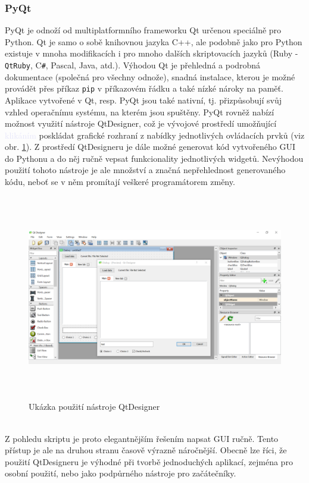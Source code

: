 \documentclass[a4paper, 12pt]{article}
\begin{document}
\subsubsection*{PyQt}
PyQt je odnoží od multiplatformního frameworku Qt určenou speciálně pro Python. Qt je samo o sobě knihovnou jazyka C++, ale podobně jako pro Python existuje v mnoha modifikacích i pro mnoho dalších skriptovacích jazyků (Ruby - \texttt{QtRuby}, C\texttt{\#}, Pascal, Java, atd.). Výhodou Qt je přehledná a podrobná dokumentace (společná pro všechny odnože), snadná instalace, kterou je možné provádět přes příkaz \texttt{pip} v příkazovém řádku a také nízké nároky na paměť. Aplikace vytvořené v Qt, resp. PyQt jsou také nativní, tj. přizpůsobují svůj vzhled operačnímu systému, na kterém jsou spuštěny. PyQt rovněž nabízí možnost využití nástroje QtDesigner, což je vývojové prostředí umožňující \textcolor{lavender}{klikáním} poskládat grafické rozhraní z nabídky jednotlivých ovládacích prvků (viz obr. \ref{fig:QtDesigner}). Z prostředí QtDesigneru je dále možné generovat kód vytvořeného GUI do Pythonu a do něj ručně vepsat funkcionality jednotlivých widgetů. Nevýhodou použití tohoto nástroje je ale množství a značná nepřehlednost generovaného kódu, neboť se v něm promítají veškeré programátorem \uv{\textcolor{lavender}{naklikané}} změny.
\newline
\begin{figure}[hbt!]
    \centering
    \includegraphics[width=\linewidth,height=9cm]{QtDesigner.png}
    \caption{Ukázka použití nástroje QtDesigner}
    \label{fig:QtDesigner}
\end{figure}
\\
\noindent Z pohledu skriptu je proto elegantnějším řešením napsat GUI ručně. Tento přístup je ale na druhou stranu časově výrazně náročnější. Obecně lze říci, že použití QtDesigneru je výhodné při tvorbě jednoduchých aplikací, zejména pro osobní použití, nebo jako podpůrného nástroje pro začátečníky.
\end{document}
